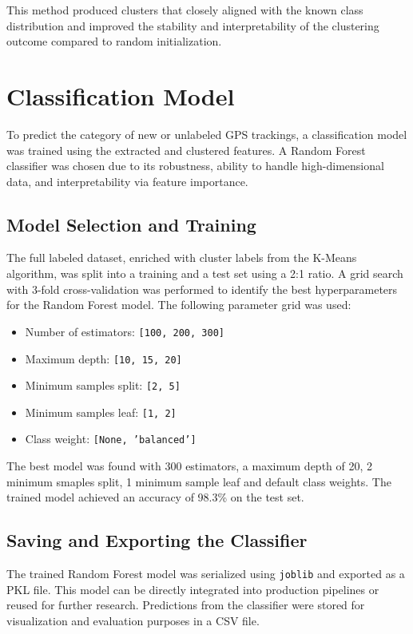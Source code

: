 \documentclass[a4paper,12pt,twoside]{scrreprt}
\begin{document}
This method produced clusters that closely aligned with the known class
distribution and improved the stability and interpretability of the clustering
outcome compared to random initialization.

\section{Classification Model}
To predict the category of new or unlabeled GPS trackings, a classification
model was trained using the extracted and clustered features. A Random Forest
classifier was chosen due to its robustness, ability to handle high-dimensional
data, and interpretability via feature importance.

\subsection{Model Selection and Training}

The full labeled dataset, enriched with cluster labels from the K-Means
algorithm, was split into a training and a test set using a 2:1 ratio. A grid
search with 3-fold cross-validation was performed to identify the best
hyperparameters for the Random Forest model. The following parameter grid was
used:

\begin{itemize}
  \item Number of estimators: \texttt{[100, 200, 300]}
  \item Maximum depth: \texttt{[10, 15, 20]}
  \item Minimum samples split: \texttt{[2, 5]}
  \item Minimum samples leaf: \texttt{[1, 2]}
  \item Class weight: \texttt{[None, 'balanced']}
\end{itemize}

The best model was found with 300 estimators, a maximum depth of 20,
2 minimum smaples split, 1 minimum sample leaf and default
class weights. The trained model achieved an accuracy of
98.3\% on the test set.

\subsection{Saving and Exporting the Classifier}

The trained Random Forest model was serialized using \texttt{joblib} and
exported as a PKL file. This model can be directly
integrated into production pipelines or reused for further research.
Predictions from the classifier were stored for visualization and evaluation
purposes in a CSV file.
\end{document}
